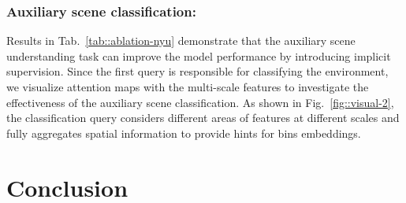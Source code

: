 \documentclass[runningheads]{llncs}
\begin{document}
\begin{table}[t!]
    \caption{Ablation study on the NYU dataset: performance of BinsFormer for different scales refinement.}
    \centering
{}
    \label{tab::ablation-nyu-multilevel}
\end{table}




 
\subsubsection{Auxiliary scene classification:} Results in Tab.~\ref{tab::ablation-nyu} demonstrate that the auxiliary scene understanding task can improve the model performance by introducing implicit supervision. Since the first query is responsible for classifying the environment, we visualize attention maps with the multi-scale features  to investigate the effectiveness of the auxiliary scene classification. As shown in Fig.~\ref{fig::visual-2}, the classification query considers different areas of features at different scales and fully aggregates spatial information to provide hints for bins embeddings. 
 \section{Conclusion}
\end{document}
